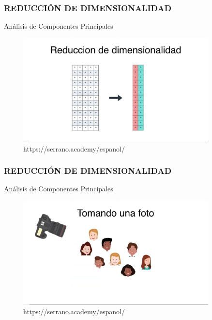 \documentclass{beamer}
\begin{document}
\begin{frame}
	\frametitle{REDUCCIÓN DE DIMENSIONALIDAD}
	\begin{block}{Análisis de Componentes Principales}	
		\begin{figure}
			\includegraphics[width=0.9\textwidth]{PCA/IMG_3525.jpg}
			\caption{https://serrano.academy/espanol/}
		\end{figure}
	\end{block}
\end{frame}

\begin{frame}
\frametitle{REDUCCIÓN DE DIMENSIONALIDAD}
\begin{block}{Análisis de Componentes Principales}	
	\begin{figure}
		\includegraphics[width=0.9\textwidth]{PCA/IMG_3526.jpg}
		\caption{https://serrano.academy/espanol/}
	\end{figure}
\end{block}
\end{frame}
\end{document}
